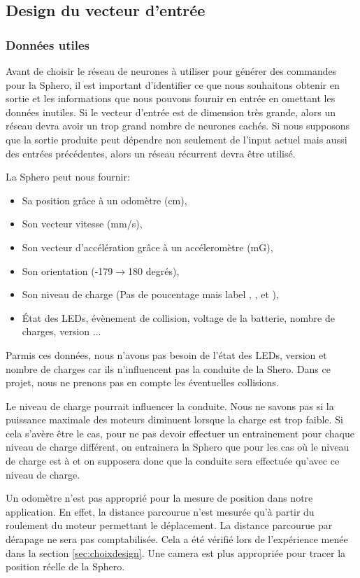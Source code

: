 \subsection{Design du vecteur d'entrée}
\subsubsection{Données utiles}
Avant de choisir le réseau de neurones à utiliser pour générer des commandes pour la Sphero, il est important d'identifier ce que nous souhaitons obtenir en sortie et les informations que nous pouvons fournir en entrée en omettant les données inutiles.
Si le vecteur d'entrée est de dimension très grande, alors un réseau \rbf devra avoir un trop grand nombre de neurones cachés\cite{Gauthier}.
Si nous supposons que la sortie produite peut dépendre non seulement de l'input actuel mais aussi des entrées précédentes, alors un réseau récurrent devra être utilisé.

La Sphero peut nous fournir\cite{SDKofficiels}:
\begin{itemize}
 \item Sa position grâce à un odomètre (cm),
 \item Son vecteur vitesse (mm/s),
 \item Son vecteur d'accélération grâce à un accéleromètre (mG),
 \item Son orientation (-179$\rightarrow$180 degrés),
 \item Son niveau de charge (Pas de poucentage mais label , ,  et ),
 \item État des LEDs, évènement de collision, voltage de la batterie, nombre de charges, version ...
\end{itemize}

Parmis ces données, nous n'avons pas besoin de l'état des LEDs, version et nombre de charges car ils n'influencent pas la conduite de la Shero.
Dans ce projet, nous ne prenons pas en compte les éventuelles collisions.

Le niveau de charge pourrait influencer la conduite.
Nous ne savons pas si la puissance maximale des moteurs diminuent lorsque la charge est trop faible.
Si cela s'avère être le cas, pour ne pas devoir effectuer un entrainement pour chaque niveau de charge différent, on entrainera la Sphero que pour les cas où le niveau de charge est à  et on supposera donc que la conduite sera effectuée qu'avec ce niveau de charge.

Un odomètre n'est pas approprié pour la mesure de position dans notre application.
En effet, la distance parcourue n'est mesurée qu'à partir du roulement du moteur permettant le déplacement.
La distance parcourue par dérapage ne sera pas comptabilisée.
Cela a été vérifié lors de l'expérience menée dans la section \ref{sec:choixdesign}.
Une camera est plus appropriée pour tracer la position réelle de la Sphero.

